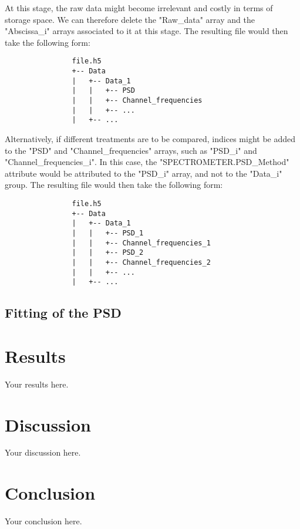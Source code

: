 \documentclass{article}
\begin{document}
            At this stage, the raw data might become irrelevant and costly in terms of storage space. We can therefore delete the "Raw\_data" array and the "Abscissa\_i" arrays associated to it at this stage. The resulting file would then take the following form:

            \begin{verbatim}
                file.h5
                +-- Data
                |   +-- Data_1
                |   |   +-- PSD
                |   |   +-- Channel_frequencies
                |   |   +-- ...
                |   +-- ...
            \end{verbatim}

            Alternatively, if different treatments are to be compared, indices might be added to the "PSD" and "Channel\_frequencies" arrays, such as "PSD\_i" and "Channel\_frequencies\_i". In this case, the "SPECTROMETER.PSD_Method" attribute would be attributed to the "PSD\_i" array, and not to the "Data\_i" group. The resulting file would then take the following form:

            \begin{verbatim}
                file.h5
                +-- Data
                |   +-- Data_1
                |   |   +-- PSD_1
                |   |   +-- Channel_frequencies_1
                |   |   +-- PSD_2
                |   |   +-- Channel_frequencies_2
                |   |   +-- ...
                |   +-- ...
            \end{verbatim}

        \subsection{Fitting of the PSD}

          


\section{Results}
Your results here.

\section{Discussion}
Your discussion here.

\section{Conclusion}
Your conclusion here.



\end{document}
